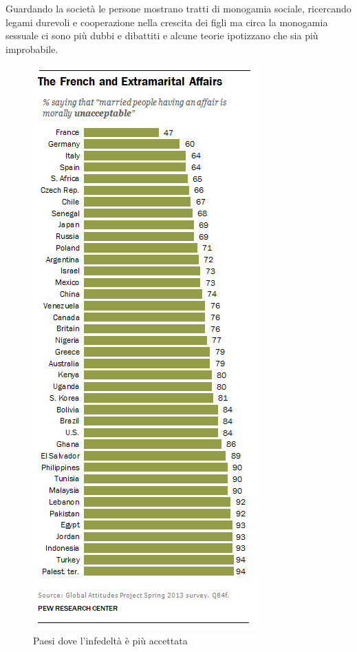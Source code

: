 \documentclass[12pt]{book} %
\begin{document}
Guardando la società le persone mostrano tratti di monogamia sociale, ricercando legami durevoli e cooperazione
nella crescita dei figli ma circa la monogamia sessuale ci sono più dubbi e dibattiti e alcune teorie ipotizzano che sia più improbabile. 

\needspace{4cm}
\begin{figure}
  \centering
  \includegraphics[width=0.95\linewidth]{images/Libro-img016.jpg}
  \begin{minipage}{\linewidth}
    \caption{Paesi dove l'infedeltà è più accettata}
  \end{minipage}
\end{figure}
\end{document}
